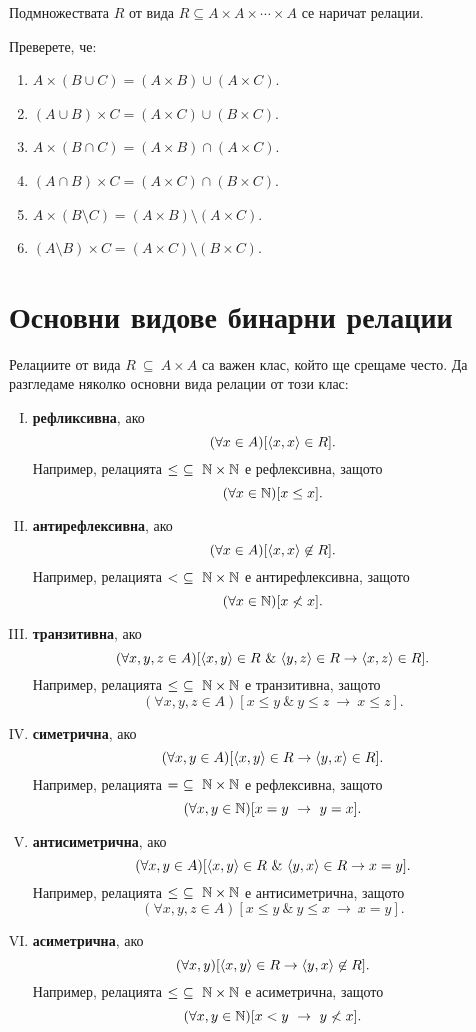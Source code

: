 Подмножествата $R$ от вида $R \subseteq A\times A\times\cdots\times A$ се наричат релации.

\begin{problem}
  Преверете, че:
  \begin{enumerate}[1)]
  \item 
    $A\times(B\cup C) = (A\times B) \cup (A\times C)$.
  \item
    $(A\cup B)\times C = (A\times C)\cup (B\times C)$.
  \item 
    $A\times(B\cap C) = (A\times B) \cap (A\times C)$.
  \item
    $(A \cap B)\times C = (A \times C)\cap(B\times C)$.
  \item 
    $A\times(B\setminus C) = (A\times B) \setminus (A\times C)$.
  \item
    $(A\setminus B)\times C = (A\times C)\setminus (B\times C)$.
  \end{enumerate}
\end{problem}

\section{Основни видове бинарни релации}
Релациите от вида $R\ \subseteq\ A\times A$ са важен клас, който ще срещаме често.
Да разгледаме няколко основни вида релации от този клас:
\begin{enumerate}[I)]
\item
  {\bf рефликсивна}, ако
  \[(\forall x\in A)[\langle{x,x}\rangle\in R].\]
  Например, релацията $\leq\ \subseteq\ \Nat\times\Nat$ е рефлексивна, защото
  \[(\forall x\in \mathbb{N})[x \leq x].\]
\item
  {\bf антирефлексивна}, ако
  \[(\forall x\in A)[\langle{x,x}\rangle\not\in R].\]
  Например, релацията $<\ \subseteq\ \Nat\times\Nat$ е антирефлексивна, защото
  \[(\forall x\in \mathbb{N})[x \not< x].\]
\item
  {\bf транзитивна}, ако
  \[(\forall x,y,z\in A)[\pair{x,y}\in R\ \&\ \pair{y,z}\in R \rightarrow \pair{x,z}\in R].\]
  Например, релацията $\leq\ \subseteq\ \Nat\times\Nat$ е транзитивна, защото
  \[(\forall x,y,z\in A)[x \leq y\ \&\ y \leq z\ \rightarrow\ x\leq z].\]
\item
  {\bf симетрична}, ако
  \[(\forall x,y\in A)[\langle{x,y}\rangle\in R \rightarrow \langle{y,x}\rangle\in R].\]
  Например, релацията $=\ \subseteq\ \mathbb{N}\times\mathbb{N}$ е рефлексивна, защото
  \[(\forall x,y\in \Nat)[x = y\ \rightarrow\ y = x].\]
\item
  {\bf антисиметрична}, ако
  \[(\forall x,y\in A)[\pair{x,y}\in R\ \&\ \pair{y,x}\in R \rightarrow x = y].\]
  Например, релацията $\leq\ \subseteq\ \Nat\times\Nat$ е антисиметрична, защото
  \[(\forall x,y,z\in A)[x \leq y\ \&\ y \leq x\ \rightarrow\ x = y].\]
\item
  {\bf асиметрична}, ако
  \[(\forall x,y)[\langle{x,y}\rangle\in R \rightarrow \langle{y,x}\rangle\not\in R].\]
  Например, релацията $\leq\ \subseteq\ \Nat\times\Nat$ е асиметрична, защото
  \[(\forall x,y\in \mathbb{N})[x < y\ \rightarrow\ y \not< x].\]
\end{enumerate}

